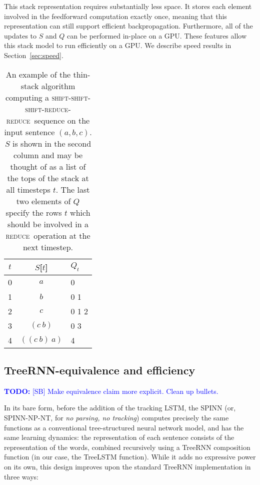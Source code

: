 \documentclass[11pt]{article}
\newcommand\todo[1]{\textcolor{blue}{\textbf{TODO:} #1}}
\newcommand{\shift}{\textsc{shift}}
\newcommand{\reduce}{\textsc{reduce}}
\begin{document}
This stack representation requires substantially less space. It stores each element involved in the feedforward computation exactly once, meaning that this representation can still support efficient backpropagation. Furthermore, all of the updates to $S$ and $Q$ can be performed in-place on a GPU. These features allow this stack model to run efficiently on a GPU. We describe speed results in Section~\ref{sec:speed}.

\begin{table}
\centering
\begin{tabular}{c|cl}
  \toprule
  $t$ & $S$[$t$] & $Q_t$ \\
  \midrule
  0 & $a$ & 0 \\
  1 & $b$ & 0 1 \\
  2 & $c$ & 0 1 2 \\
  3 & $(c~b)$ & 0 3 \\
  4 & $((c~b)~a)$ & 4 \\
  \bottomrule
\end{tabular}
\caption{An example of the thin-stack algorithm computing a \shift-\shift-\shift-\reduce-\reduce~sequence on the input sentence $(a, b, c)$. $S$ is shown in the second column and may be thought of as a list of the tops of the stack at all timesteps $t$. The last two elements of $Q$ specify the rows $t$ which should be involved in a \reduce~operation at the next timestep.}
\label{tbl:thin-stack}
\end{table}

\subsection{TreeRNN-equivalence and efficiency}

\todo{[SB] Make equivalence claim more explicit. Clean up bullets.}

In its bare form, before the addition of the tracking LSTM, the SPINN (or, SPINN-NP-NT, for \textit{no parsing, no tracking}) computes precisely the same functions as a conventional tree-structured neural network model, and has the same learning dynamics: the representation of each sentence consists of the representation of the words, combined recursively using a TreeRNN composition function (in our case, the TreeLSTM function). While it adds no expressive power on its own, this design improves upon the standard TreeRNN implementation in three ways:
\end{document}
